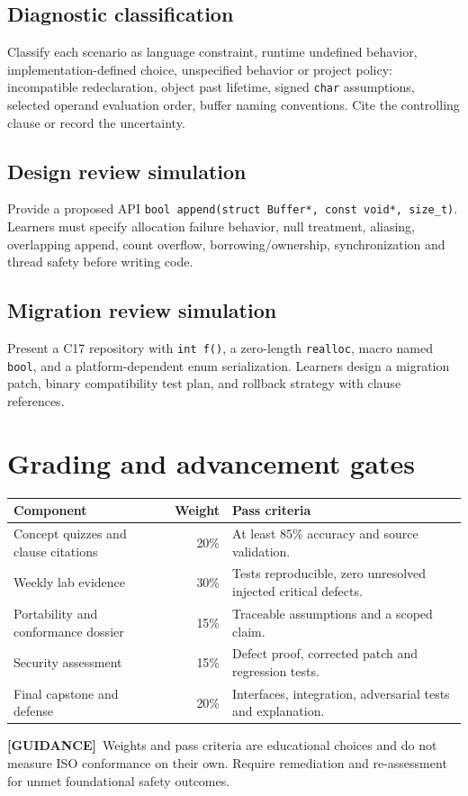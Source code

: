 \documentclass[10pt,letterpaper,oneside]{report}
\newcommand{\guidance}{\textbf{[GUIDANCE]}}
\begin{document}
\section{Diagnostic classification}
Classify each scenario as language constraint, runtime undefined behavior, implementation-defined choice, unspecified behavior or project policy: incompatible redeclaration, object past lifetime, signed \texttt{char} assumptions, selected operand evaluation order, buffer naming conventions. Cite the controlling clause or record the uncertainty.
\section{Design review simulation}
Provide a proposed API \texttt{bool append(struct Buffer*, const void*, size\_t)}. Learners must specify allocation failure behavior, null treatment, aliasing, overlapping append, count overflow, borrowing/ownership, synchronization and thread safety before writing code.
\section{Migration review simulation}
Present a C17 repository with \texttt{int f()}, a zero-length \texttt{realloc}, macro named \texttt{bool}, and a platform-dependent enum serialization. Learners design a migration patch, binary compatibility test plan, and rollback strategy with clause references.
\chapter{Grading and advancement gates}
\begin{longtable}{>{\raggedright\arraybackslash}p{.41\linewidth}r >{\raggedright\arraybackslash}p{.41\linewidth}}\toprule Component & Weight & Pass criteria\\\midrule\endhead
Concept quizzes and clause citations & 20\% & At least 85\% accuracy and source validation.\\
Weekly lab evidence & 30\% & Tests reproducible, zero unresolved injected critical defects.\\
Portability and conformance dossier & 15\% & Traceable assumptions and a scoped claim.\\
Security assessment & 15\% & Defect proof, corrected patch and regression tests.\\
Final capstone and defense & 20\% & Interfaces, integration, adversarial tests and explanation.\\\bottomrule\end{longtable}
\guidance\ Weights and pass criteria are educational choices and do not measure ISO conformance on their own. Require remediation and re-assessment for unmet foundational safety outcomes.
\end{document}
